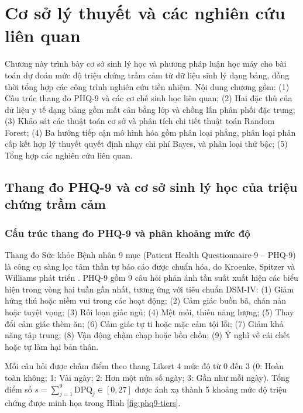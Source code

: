 \chapter{Cơ sở lý thuyết và các nghiên cứu liên quan}
\label{ch:co-so-ly-thuyet}

Chương này trình bày cơ sở sinh lý học và phương pháp luận học máy cho bài toán dự đoán mức độ triệu chứng trầm cảm từ dữ liệu sinh lý dạng bảng, đồng thời tổng hợp các công trình nghiên cứu tiền nhiệm. Nội dung chương gồm: (1) Cấu trúc thang đo PHQ-9 và các cơ chế sinh học liên quan; (2) Hai đặc thù của dữ liệu y tế dạng bảng gồm mất cân bằng lớp và chồng lấn phân phối đặc trưng; (3) Khảo sát các thuật toán cơ sở và phân tích chi tiết thuật toán Random Forest; (4) Ba hướng tiếp cận mô hình hóa gồm phân loại phẳng, phân loại phân cấp kết hợp lý thuyết quyết định nhạy chi phí Bayes, và phân loại thứ bậc; (5) Tổng hợp các nghiên cứu liên quan.

\section{Thang đo PHQ-9 và cơ sở sinh lý học của triệu chứng trầm cảm}
\label{sec:thang-do-phq9-va-sinh-ly}

\subsection{Cấu trúc thang đo PHQ-9 và phân khoảng mức độ}
\label{subsec:cau-truc-phq9}

Thang đo Sức khỏe Bệnh nhân 9 mục (Patient Health Questionnaire-9 -- PHQ-9) là công cụ sàng lọc tâm thần tự báo cáo được chuẩn hóa, do Kroenke, Spitzer và Williams phát triển \cite{kroenke2001phq, spitzer1999validation}. PHQ-9 gồm 9 câu hỏi phản ánh tần suất xuất hiện các biểu hiện trong vòng hai tuần gần nhất, tương ứng với tiêu chuẩn DSM-IV: (1) Giảm hứng thú hoặc niềm vui trong các hoạt động; (2) Cảm giác buồn bã, chán nản hoặc tuyệt vọng; (3) Rối loạn giấc ngủ; (4) Mệt mỏi, thiếu năng lượng; (5) Thay đổi cảm giác thèm ăn; (6) Cảm giác tự ti hoặc mặc cảm tội lỗi; (7) Giảm khả năng tập trung; (8) Vận động chậm chạp hoặc bồn chồn; (9) Ý nghĩ về cái chết hoặc tự làm hại bản thân.

Mỗi câu hỏi được chấm điểm theo thang Likert 4 mức độ từ 0 đến 3 (0: Hoàn toàn không; 1: Vài ngày; 2: Hơn một nửa số ngày; 3: Gần như mỗi ngày). Tổng điểm số $s = \sum_{j=1}^9 \text{DPQ}_j \in [0, 27]$ được ánh xạ thành 5 khoảng mức độ triệu chứng được minh họa trong Hình \ref{fig:phq9-tiers}.

